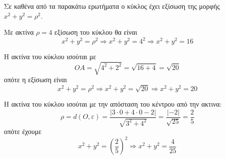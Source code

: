 
Σε καθένα από τα παρακάτω ερωτήματα ο κύκλος έχει εξίσωση της μορφής $ x^2+y^2=\rho^2 $.
\begin{alist}
\item Με ακτίνα $ \rho=4 $ εξίσωση του κύκλου θα είναι
\[ x^2+y^2=\rho^2\Rightarrow x^2+y^2=4^2\Rightarrow x^2+y^2=16 \]
\item Η ακτίνα του κύκλου ισούται με
\[ OA=\sqrt{4^2+2^2}=\sqrt{16+4}=\sqrt{20} \]
οπότε η εξίσωση είναι
\[ x^2+y^2=\rho^2\Rightarrow x^2+y^2=\sqrt{20}\Rightarrow x^2+y^2=20 \]
\item Η ακτίνα του κύκλου ισούται με την απόσταση του κέντρου από την ακτινα:
\[ \rho=d(O,\varepsilon)=\frac{|3\cdot 0+4\cdot 0-2|}{\sqrt{3^2+4^2}}=\frac{|-2|}{\sqrt{25}}=\frac{2}{5} \]
οπότε έχουμε
\[ x^2+y^2=\left(\frac{2}{5}\right)^2\Rightarrow x^2+y^2=\frac{4}{25} \]
\end{alist}

